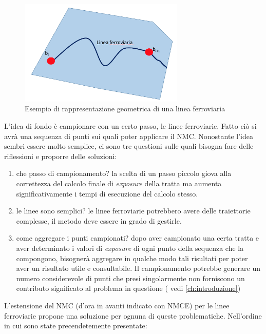 \begin{figure}[bth]
  \centering
  \includegraphics[width=0.7\textwidth]{img/lineaFerroviaria}
  \caption{Esempio di rappresentazione geometrica di una linea ferroviaria } 
  \label{lineeFerroviarie}
\end{figure}
L'idea di fondo è campionare con un certo passo, le linee ferroviarie. Fatto ciò si avrà una sequenza di punti sui quali poter applicare il NMC. \newline
Nonostante l'idea sembri essere molto semplice, ci sono tre questioni sulle quali bisogna fare delle riflessioni e proporre delle soluzioni:
\begin{enumerate}
\item che passo di campionamento? la scelta di un passo piccolo giova alla correttezza del calcolo finale di \textit{exposure} della tratta ma aumenta significativamente i tempi di esecuzione del calcolo stesso.
\item le linee sono semplici? le linee ferroviarie potrebbero avere delle traiettorie complesse, il metodo deve essere in grado di gestirle.
\item come aggregare i punti campionati? dopo aver campionato una certa tratta e aver determinato i valori di \textit{exposure} di ogni punto della sequenza che la compongono, bisognerà aggregare in qualche modo tali risultati per poter aver un risultato utile e consultabile. \newline 
Il campionamento potrebbe generare un numero considerevole di punti che presi singolarmente non forniscono un contributo significato al problema in questione ( vedi \ref{ch:introduzione})
\end{enumerate}
L'estensione del NMC (d'ora in avanti indicato con NMCE) per le linee ferroviarie propone una soluzione per ognuna di queste problematiche. Nell'ordine in cui sono state precendetemente presentate: 
